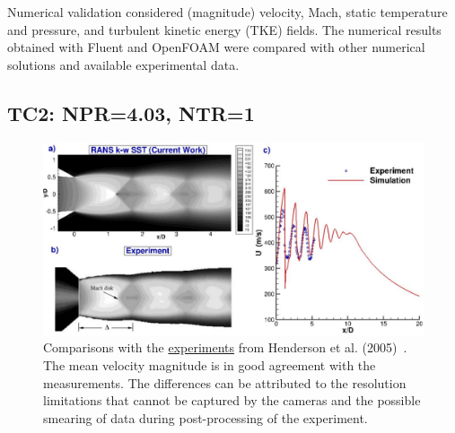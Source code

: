 \documentclass[12pt]{article}
\begin{document}
Numerical validation considered (magnitude) velocity, Mach, static temperature and pressure, and turbulent kinetic energy (TKE) fields. The numerical results obtained with Fluent and OpenFOAM were compared with other numerical solutions and available experimental data.


\subsection{TC2: NPR=4.03, NTR=1}

\begin{figure}[H]
    \centering
    \includegraphics[width=\linewidth]{figs/f6.png}
    \caption{Comparisons with the \uline{experiments} from Henderson et al. (2005)~\cite{henderson2005experimental}. The mean velocity magnitude is in good agreement with the measurements. The differences can be attributed to the resolution limitations that cannot be captured by the cameras and the possible smearing of data during post-processing of the experiment.}
    \label{fig:enter-label}
\end{figure}
\end{document}
